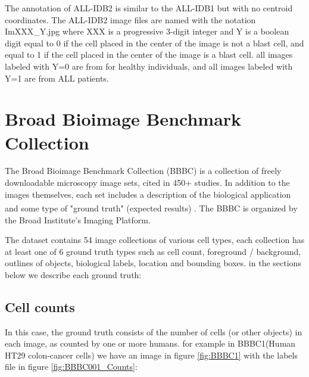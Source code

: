 \vspace{-0.14in}

The annotation of ALL-IDB2 is similar to the ALL-IDB1 but with no centroid coordinates. The ALL-IDB2 image files are named with the notation ImXXX\_Y.jpg where XXX is a progressive 3-digit integer and Y is a boolean digit equal to 0 if the cell placed in the center of the image is not a blast cell, and equal to 1 if the cell placed in the center of the image is a blast cell. all images labeled with Y=0 are from for healthy individuals, and all images labeled with Y=1 are from ALL patients. 

\section{Broad Bioimage Benchmark Collection}
\hspace{\parindent}
The Broad Bioimage Benchmark Collection (BBBC) is a collection of freely downloadable microscopy image sets, cited in 450+ studies. In addition to the images themselves, each set includes a description of the biological application and some type of "ground truth" (expected results) \textsuperscript{\cite{ljosa2012annotated}}. The BBBC is organized by the Broad Institute's Imaging Platform.\

The dataset contains 54 image collections of various cell types, each collection has at least one of 6 ground truth types such as cell count, foreground / background, outlines of objects, biological labels, location and bounding boxes. in the sections below we describe each ground truth:

\subsection{Cell counts}
\hspace{\parindent}
In this case, the ground truth consists of the number of cells (or other objects) in each image, as counted by one or more humans. for example in BBBC1(Human HT29 colon-cancer cells) we have an image in figure \ref{fig:BBBC1} with the labels file in figure \ref{fig:BBBC001_Counts}:

